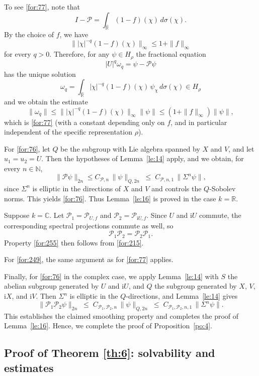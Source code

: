 \documentclass[11 pt]{amsart}
\newcommand{\NN}{\mathbb{N}}
\newcommand{\RR}{\mathbb{R}}
\newcommand{\CC}{\mathbb{C}}
\theoremstyle{definition}
\numberwithin{equation}{section}
\begin{document}
To see \eqref{for:77}, note that
\[
  I-\mathcal{P}=\int_{\widehat{\RR}} (1-f)(\chi)\, d\sigma(\chi).
\]
By the choice of $f$, we have
\[
  \big\||\chi|^{-q}(1-f)(\chi)\big\|_\infty \le 1+\|f\|_\infty
\]
for every $q>0$. Therefore, for any $\psi\in H_\rho$ the fractional equation
\[
  |U|^q\omega_q=\psi-\mathcal{P}\psi
\]
has the unique solution
\[
  \omega_q=\int_{\widehat{\RR}} |\chi|^{-q}(1-f)(\chi)\,\psi_\chi\, d\sigma(\chi)\in H_\rho
\]
and we obtain the estimate
\[
  \|\omega_q\|\le \big\||\chi|^{-q}(1-f)(\chi)\big\|_\infty\|\psi\|
  \le (1+\|f\|_\infty)\|\psi\|,
\]
which is \eqref{for:77} (with a constant depending only on $f$, and in particular independent of the specific representation $\rho$).

For \eqref{for:76}, let $Q$ be the subgroup with Lie algebra spanned by $X$ and $V$, and let $u_1=u_2=U$. Then the hypotheses of Lemma~\ref{le:14} apply, and we obtain, for every $n\in\NN$,
\[
  \|\mathcal{P}\psi\|_{2n}\le C_{\mathcal P,n}\,\|\psi\|_{Q,2n}
  \;\le\; C_{\mathcal P,n,1}\,\|\Sigma^n\psi\|,
\]
since $\Sigma^n$ is elliptic in the directions of $X$ and $V$ and controls the $Q$-Sobolev norms. This yields \eqref{for:76}. Thus Lemma~\ref{le:16} is proved in the case $k=\RR$.

Suppose $k=\CC$.  Let $\mathcal{P}_1=\mathcal{P}_{U,f}$ and $\mathcal{P}_2=\mathcal{P}_{\mathrm{i}U,f}$. Since $U$ and $\mathrm{i}U$ commute, the corresponding spectral projections commute as well, so
\[
  \mathcal{P}_1\mathcal{P}_2 = \mathcal{P}_2\mathcal{P}_1.
\]
Property \eqref{for:255} then follows from \eqref{for:215}.

 For \eqref{for:249}, the same argument as for \eqref{for:77} applies.

Finally, for \eqref{for:76} in the complex case, we apply Lemma~\ref{le:14} with $S$ the abelian subgroup generated by $U$ and $\mathrm{i}U$, and $Q$ the subgroup generated by $X$, $V$, $\mathrm{i}X$, and $\mathrm{i}V$. Then $\Sigma^n$ is elliptic in the $Q$-directions, and Lemma~\ref{le:14} gives
\[
  \|\mathcal{P}_1\mathcal{P}_2\psi\|_{2n}
  \;\le\; C_{\mathcal{P}_1,\mathcal{P}_2,n}\,\|\psi\|_{Q,2n}
  \;\le\; C_{\mathcal{P}_1,\mathcal{P}_2,n,1}\,\|\Sigma^n\psi\|.
\]
This establishes the claimed smoothing property and completes the proof of Lemma~\ref{le:16}. Hence, we complete the proof of Proposition~\ref{po:4}.



\subsection{Proof of Theorem \ref{th:6}: solvability and estimates}
\end{document}
